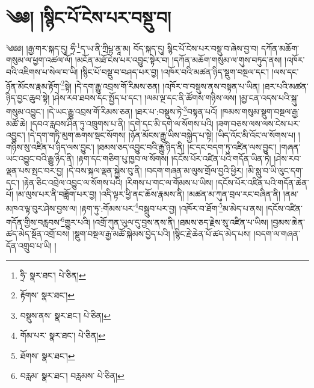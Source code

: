 \setcounter{footnote}{0} 
\chapter{༄༅། །སྙིང་པོ་ངེས་པར་བསྡུ་བ།}༄༅༅། །རྒྱ་གར་སྐད་དུ། ཧྲྀ་\footnote{ཧྲི་  སྣར་ཐང་།  པེ་ཅིན། }ད་ཡ་ནི་ཀྲིཔྟ་ནཱ་མ། བོད་སྐད་དུ། སྙིང་པོ་ངེས་པར་བསྡུ་བ་ཞེས་བྱ་བ། དཀོན་མཆོག་གསུམ་ལ་ཕྱག་འཚལ་ལོ། །མངོན་མཐོ་ངེས་པར་འབྱུང་སྟེར་བ། །དཀོན་མཆོག་གསུམ་ལ་གུས་བཏུད་ནས། །འཁོར་བའི་འཇིགས་པ་སེལ་བ་ཡི། །སྙིང་པོ་བསྡུ་བ་བཤད་པར་བྱ། །འཁོར་བའི་མཚན་ཉིད་སྡུག་བསྔལ་དང་། །ལས་དང་ཉོན་མོངས་རྣམ་རྟོག་\footnote{རྟོགས་  སྣར་ཐང་། }སྟེ། །དེ་དག་རྒྱུ་འབྲས་གོ་རིམས་ཅན། །འཁོར་བ་བསྡུས་ནས་བསྟན་པ་ཡིན། །ཐར་པའི་མཚན་ཉིད་བྱང་ཆུབ་སྟེ། །ཤེས་རབ་ཐབས་དང་སྤྱོད་པ་དང་། །ལམ་ལྔ་དང་ནི་ཚོགས་གཉིས་ལས། །མྱ་ངན་འདས་པའི་སྐུ་གསུམ་འབྱུང་། །དེ་ཡང་རྒྱུ་འབྲས་གོ་རིམས་ཅན། །ཐར་པ་:བསྡུས་ཏེ་\footnote{བསྡུས་ནས་  སྣར་ཐང་།  པེ་ཅིན། }བསྟན་པའོ། །ཁམས་གསུམ་སྡུག་བསྔལ་རྒྱ་མཚོ་ཆེ། །དབའ་རླབས་ཤིན་ཏུ་འཁྲུགས་པ་ནི། །དགེ་དང་མི་དགེ་ལ་སོགས་པའི། །ཟག་བཅས་ལས་ལས་ངེས་པར་འབྱུང་། །དེ་དག་གཏི་མུག་ཆགས་སྡང་སོགས། །ཉོན་མོངས་རྒྱུ་ཡིས་བསྐྱེད་པ་སྟེ། །ཡིད་འོང་མི་འོང་ལ་སོགས་པ། །གཉིས་སུ་འཛིན་པ་ཉིད་ལས་བྱུང་། །ཐམས་ཅད་འབྱུང་བའི་རྒྱུ་ཉིད་ནི། །ང་དང་བདག་ཏུ་འཛིན་ལས་བྱུང་། །གཞན་ཡང་འབྱུང་བའི་རྒྱུ་ཉིད་ནི། །རྟག་དང་གཅིག་པུ་ཁྱབ་ལ་སོགས། །དངོས་པོར་འཛིན་པའི་གདོན་ཡིན་ཏེ། །ཤེས་རབ་ལྡན་པས་སྤང་བར་བྱ། །དེ་བས་སྐལ་ལྡན་སྐྱེས་བུ་ནི། །བདག་གཞན་མ་ལུས་གྲོལ་བྱའི་ཕྱིར། །མི་སླུ་བ་ཡི་ལུང་དག་དང་། །རྟེན་ཅིང་འབྲེལ་འབྱུང་ལ་སོགས་པའི། །རིགས་པ་གང་ལ་གོམས་པ་ཡིས། །དངོས་པོར་འཛིན་པའི་གདོན་ཆེན་པོ། །མ་ལུས་པར་ནི་བཟློག་པར་བྱ། །འདི་ལྟར་ཕྱི་ནང་ཆོས་རྣམས་ནི། །མཚན་མ་ཀུན་བྲལ་རང་བཞིན་ནི། །ནམ་མཁའ་ལྟ་བུར་ཤེས་བྱས་ལ། །རྟག་ཏུ་:གོམས་པར་\footnote{གོམ་པར་  སྣར་ཐང་།  པེ་ཅིན། }བསྒྲུབ་པར་བྱ། །འཁོར་བ་ཐོག་\footnote{ཐོགས་  སྣར་ཐང་། }མ་མེད་པ་ནས། །དངོས་འཛིན་གདོན་གྱིས་བརླབས་\footnote{བརླམ་  སྣར་ཐང་། བརླམས་  པེ་ཅིན། }གྱུར་པའི། །འགྲོ་ཀུན་ཡུལ་དུ་བྱས་ནས་ནི། །ཐམས་ཅད་རྗེས་སུ་འཛིན་པ་ཡིས། །བྱམས་ཆེན་ཚད་མེད་སྔོན་འགྲོ་བས། །སྡུག་བསྔལ་རྒྱ་མཚོ་སྐེམས་བྱེད་པའི། །སྙིང་རྗེ་ཆེན་པོ་ཚད་མེད་པས། །བདག་ལ་གཞན་དོན་འགྲུབ་པ་ཡི། །
